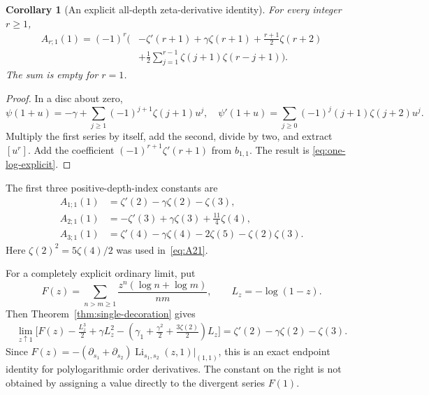 \documentclass[11pt,oneside]{article}
\numberwithin{equation}{section}
\newtheorem{corollary}[theorem]{Corollary}
\theoremstyle{definition}
\theoremstyle{remark}
\DeclareMathOperator{\Li}{Li}
\begin{document}
\begin{corollary}[An explicit all-depth zeta-derivative identity]
\label{cor:one-log}
For every integer $r\ge1$,
\begin{equation}\label{eq:one-log-explicit}
\begin{split}
A_{r;1}(1)=(-1)^r\biggl(&-\zeta'(r+1)+\gamma\zeta(r+1)
 +\frac{r+1}{2}\zeta(r+2)\\
 &+\frac12\sum_{j=1}^{r-1}\zeta(j+1)\zeta(r-j+1)\biggr).
\end{split}
\end{equation}
The sum is empty for $r=1$.
\end{corollary}

\begin{proof}
In a disc about zero,
\[
\psi(1+u)=-\gamma+\sum_{j\ge1}(-1)^{j+1}\zeta(j+1)u^j,
\quad
\psi'(1+u)=\sum_{j\ge0}(-1)^j(j+1)\zeta(j+2)u^j.
\]
Multiply the first series by itself, add the second, divide by two, and
extract $[u^r]$. Add the coefficient
$(-1)^{r+1}\zeta'(r+1)$ from $b_{1,1}$. The result is
\eqref{eq:one-log-explicit}.
\end{proof}

The first three positive-depth-index constants are
\begin{align}
A_{1;1}(1)&=\zeta'(2)-\gamma\zeta(2)-\zeta(3),\label{eq:A11}\\
A_{2;1}(1)&=-\zeta'(3)+\gamma\zeta(3)+\frac{11}{4}\zeta(4),\label{eq:A21}\\
A_{3;1}(1)&=\zeta'(4)-\gamma\zeta(4)-2\zeta(5)-\zeta(2)\zeta(3).
\label{eq:A31}
\end{align}
Here $\zeta(2)^2=5\zeta(4)/2$ was used in~\eqref{eq:A21}.

For a completely explicit ordinary limit, put
\[
F(z)=\sum_{n>m\ge1}\frac{z^n(\log n+\log m)}{nm},
\qquad L_z=-\log(1-z).
\]
Then Theorem~\ref{thm:single-decoration} gives
\begin{equation}\label{eq:explicit-limit}
\begin{split}
\lim_{z\uparrow1}\biggl[
F(z)-\frac{L_z^3}{2}+\gamma L_z^2
-\left(\gamma_1+\frac{\gamma^2}{2}+\frac{3\zeta(2)}2\right)L_z
\biggr]
=\zeta'(2)-\gamma\zeta(2)-\zeta(3).
\end{split}
\end{equation}
Since $F(z)=-(\partial_{s_1}+\partial_{s_2})
\Li_{s_1,s_2}(z,1)|_{(1,1)}$, this is an exact endpoint identity for
polylogarithmic order derivatives. The constant on the right is not obtained
by assigning a value directly to the divergent series $F(1)$.
\end{document}
